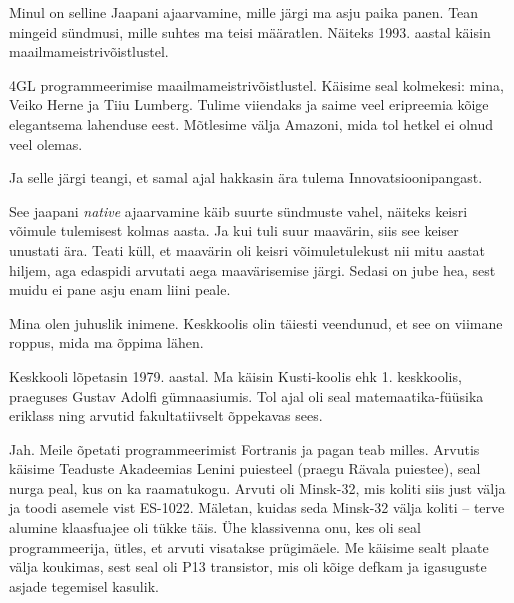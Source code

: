 

Minul on selline Jaapani ajaarvamine, mille järgi ma asju paika panen. Tean
mingeid sündmusi, mille suhtes ma teisi määratlen. Näiteks 
1993. aastal käisin maailmameistrivõistlustel. 


4GL 
programmeerimise maailmameistrivõistlustel. Käisime seal kolmekesi: mina, Veiko 
Herne ja Tiiu Lumberg. 
Tulime viiendaks ja saime veel eripreemia kõige elegantsema lahenduse eest. 
Mõtlesime välja Amazoni, mida tol hetkel ei olnud veel olemas. 

Ja selle järgi teangi, et samal ajal hakkasin ära tulema 
Innovatsioonipangast. 

See jaapani \emph{native} ajaarvamine käib suurte sündmuste vahel, näiteks 
keisri võimule tulemisest kolmas aasta. Ja kui tuli suur maavärin, siis 
see keiser unustati ära. Teati küll, et maavärin oli keisri võimuletulekust nii mitu aastat hiljem, aga edaspidi arvutati aega maavärisemise järgi. 
Sedasi on jube hea, sest muidu ei pane asju enam liini peale. 


Mina olen juhuslik inimene. Keskkoolis olin 
täiesti veendunud, et see on viimane roppus, mida ma õppima lähen. 


Keskkooli lõpetasin 1979. aastal. Ma käisin Kusti-koolis ehk 1.
keskkoolis, praeguses Gustav Adolfi gümnaasiumis. Tol 
ajal oli seal matemaatika-füüsika eriklass ning arvutid fakultatiivselt õppekavas sees. 


Jah. Meile õpetati programmeerimist Fortranis ja pagan 
teab milles. Arvutis käisime Teaduste Akadeemias 
Lenini puiesteel (praegu Rävala puiestee), seal nurga peal, kus on ka
raamatukogu. Arvuti oli Minsk-32, mis 
koliti siis just välja ja toodi asemele vist ES-1022. Mäletan, kuidas seda Minsk-32 välja koliti -- terve alumine klaasfuajee oli 
tükke täis. Ühe klassivenna onu, kes oli seal programmeerija, ütles, et 
arvuti visatakse prügimäele. Me käisime sealt plaate välja koukimas, sest 
seal oli P13 transistor, mis oli kõige defkam 
ja igasuguste asjade tegemisel kasulik.

